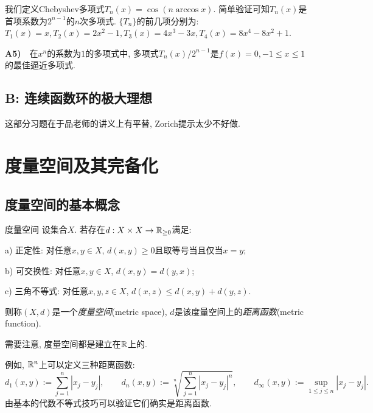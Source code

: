 \vspace{1em}
我们定义Chebyshev多项式$T_n(x)=\cos (n \arccos x)$. 简单验证可知$T_n(x)$是首项系数为$2^{n-1}$的$n$次多项式. $\{ T_n \}$的前几项分别为: $T_1(x)=x, T_2(x)=2x^2-1, T_3(x)=4x^3-3x, T_4(x)=8x^4-8x^2+1$. 

\vspace{1em}
\textbf{A5)}~~在$x^n$的系数为$1$的多项式中, 多项式$T_n(x)/2^{n-1}$是$f(x)=0, -1 \leq x \leq 1$的最佳逼近多项式. 

\subsection*{B: 连续函数环的极大理想}

这部分习题在于品老师的讲义上有平替, Zorich提示太少不好做. 















\newpage
\section{度量空间及其完备化}

\subsection{度量空间的基本概念}

\begin{definition}{度量空间}
	设集合$X$. 若存在$d:X \times X \to \mathbb{R} _{\geq 0}$满足: 
	
	a) 正定性: 对任意$x,y \in X$, $d(x,y)\geq 0$且取等号当且仅当$x=y$; 
	
	b) 可交换性: 对任意$x,y \in X$, $d(x,y)=d(y,x)$; 
	
	c) 三角不等式: 对任意$x,y,z \in X$, $d(x,z) \leq d(x,y)+d(y,z)$. 
	
	\noindent
	则称$(X,d)$是一个\textit{度量空间}(metric space), $d$是该度量空间上的\textit{距离函数}(metric function). 
\end{definition}
\begin{remark}
	需要注意, 度量空间都是建立在$\mathbb{R}$上的. 
\end{remark}

例如, $\mathbb{R} ^n$上可以定义三种距离函数: $$d_1(x,y) := \sum_{j=1}^n |x_j-y_j|,\qquad d_n(x,y) := \sqrt[n]{\sum_{j=1}^n |x_j-y_j|^n},\qquad d_{\infty}(x,y) := \sup_{1 \leq j \leq n}|x_j-y_j|. $$
由基本的代数不等式技巧可以验证它们确实是距离函数. 


